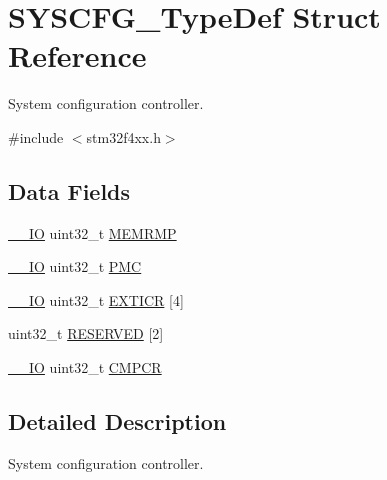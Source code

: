 \hypertarget{struct_s_y_s_c_f_g___type_def}{\section{S\-Y\-S\-C\-F\-G\-\_\-\-Type\-Def Struct Reference}
\label{struct_s_y_s_c_f_g___type_def}
}


System configuration controller.  




{\ttfamily \#include $<$stm32f4xx.\-h$>$}

\subsection*{Data Fields}
\begin{DoxyCompactItemize}
\item 
\hyperlink{group___c_m_s_i_s__core__definitions_gaec43007d9998a0a0e01faede4133d6be}{\-\_\-\-\_\-\-I\-O} uint32\-\_\-t \hyperlink{struct_s_y_s_c_f_g___type_def_ab36c409d0a009e3ce5a89ac55d3ff194}{M\-E\-M\-R\-M\-P}
\item 
\hyperlink{group___c_m_s_i_s__core__definitions_gaec43007d9998a0a0e01faede4133d6be}{\-\_\-\-\_\-\-I\-O} uint32\-\_\-t \hyperlink{struct_s_y_s_c_f_g___type_def_a2130abf1fefb63ce4c4b138fd8c9822a}{P\-M\-C}
\item 
\hyperlink{group___c_m_s_i_s__core__definitions_gaec43007d9998a0a0e01faede4133d6be}{\-\_\-\-\_\-\-I\-O} uint32\-\_\-t \hyperlink{struct_s_y_s_c_f_g___type_def_a52f7bf8003ba69d66a4e86dea6eeab65}{E\-X\-T\-I\-C\-R} \mbox{[}4\mbox{]}
\item 
uint32\-\_\-t \hyperlink{struct_s_y_s_c_f_g___type_def_afaf27b66c1edc60064db3fa6e693fb59}{R\-E\-S\-E\-R\-V\-E\-D} \mbox{[}2\mbox{]}
\item 
\hyperlink{group___c_m_s_i_s__core__definitions_gaec43007d9998a0a0e01faede4133d6be}{\-\_\-\-\_\-\-I\-O} uint32\-\_\-t \hyperlink{struct_s_y_s_c_f_g___type_def_a08ddbac546fa9928256654d31255c8c3}{C\-M\-P\-C\-R}
\end{DoxyCompactItemize}


\subsection{Detailed Description}
System configuration controller. 

